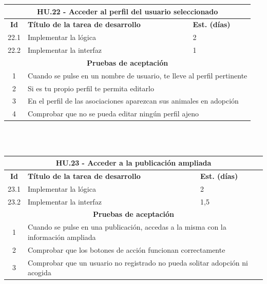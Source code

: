\begin{tabular}{|c|p{9.5cm}|p{1cm}|}
	\hline
	\multicolumn{3}{|c|}{\textbf{HU.22 - Acceder al perfil del usuario seleccionado}} \\
	\hline
	\textbf{Id} & \textbf{Título de la tarea de desarrollo} & \textbf{Est. (días)} \\
	\hline
	22.1 &  Implementar la lógica & 2 \\ \hline
	22.2 &  Implementar la interfaz & 1 \\ \hline
	\multicolumn{3}{|c|}{\textbf{Pruebas de aceptación}} \\ \hline
	1 & \multicolumn{2}{|p{12cm}|}{Cuando se pulse en un nombre de usuario, te lleve al perfil pertinente} \\ \hline
	2 & \multicolumn{2}{|p{12cm}|}{Si es tu propio perfil te permita editarlo} \\ \hline
	3 & \multicolumn{2}{|p{12cm}|}{En el perfil de las asociaciones aparezcan sus animales en adopción} \\ \hline
	4 & \multicolumn{2}{|p{12cm}|}{Comprobar que no se pueda editar ningún perfil ajeno} \\ \hline
	
\end{tabular} \\ \\

\begin{tabular}{|c|p{9.5cm}|p{1cm}|}
	\hline
	\multicolumn{3}{|c|}{\textbf{HU.23 - Acceder a la publicación ampliada}} \\
	\hline
	\textbf{Id} & \textbf{Título de la tarea de desarrollo} & \textbf{Est. (días)} \\
	\hline
	23.1 &  Implementar la lógica & 2 \\ \hline
	23.2 &  Implementar la interfaz & 1,5 \\ \hline
	\multicolumn{3}{|c|}{\textbf{Pruebas de aceptación}} \\ \hline
	1 & \multicolumn{2}{|p{12cm}|}{Cuando se pulse en una publicación, accedas a la misma con la información ampliada} \\ \hline
	2 & \multicolumn{2}{|p{12cm}|}{Comprobar que los botones de acción funcionan correctamente} \\ \hline
	3 & \multicolumn{2}{|p{12cm}|}{Comprobar que un usuario no registrado no pueda solitar adopción ni acogida} \\ \hline
	
\end{tabular} \\ \\


